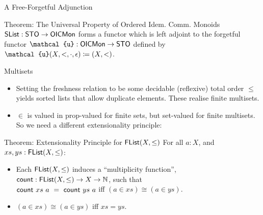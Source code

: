 \documentclass{beamer}
\begin{document}
\begin{frame}{A Free-Forgetful Adjunction}
\begin{block}{Theorem: The Universal Property of Ordered Idem. Comm. Monoids}
   $\AgdaDatatype{SList} : \AgdaDatatype{STO} \to \AgdaDatatype{OICMon}$ forms a functor which is left adjoint to the forgetful functor $\AgdaDatatype{\ensuremath{\mathcal{u}}} : \AgdaDatatype{OICMon} \to \AgdaDatatype{STO}$ defined by $\AgdaDatatype{\ensuremath{\mathcal{u}}}(X,<,\cdot,\epsilon) \coloneq (X,<)$.
 \end{block}
%
%
\end{frame}

\begin{frame}{Multisets}

\begin{itemize}
  \item Setting the freshness relation to be some decidable (reflexive) total order $\leq$ yields sorted lists that allow duplicate elements.
  These realise finite multisets.
  \item $\in$ is valued in prop-valued for finite sets, but set-valued for finite multisets. So we need a different extensionality principle:
\end{itemize}

  \begin{block}{Theorem: Extensionality Principle for $\AgdaDatatype{FList}(X, \leq)$}
    For all $a : X$, and $xs, ys : \AgdaDatatype{FList}(X, \leq)$:
  \begin{itemize}
    \item Each $\AgdaDatatype{FList}(X, \leq)$ induces a ``multiplicity function'', $\AgdaFunction{count} : \AgdaDatatype{FList}(X,\leq) \to X \to \mathbb{N}$, such that \\
          $\AgdaFunction{count}~xs~a~=~\AgdaFunction{count}~ys~a$ iff $(a \in xs) \cong (a \in ys) $.
    \item $(a \in xs) \cong (a \in ys)$ iff $xs = ys$.
  \end{itemize}
 \end{block}
\end{frame}
\end{document}
